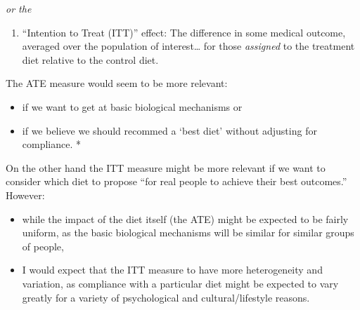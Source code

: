\documentclass[]{tufte-handout}
\providecommand{\tightlist}{%
  \setlength{\itemsep}{0pt}\setlength{\parskip}{0pt}}
\begin{document}

\emph{or the}

\begin{enumerate}
\def\labelenumi{\arabic{enumi}.}
\setcounter{enumi}{1}
\tightlist
\item
  ``Intention to Treat (ITT)'' effect: The difference in some medical
  outcome, averaged over the population of interest\ldots{} for those
  \emph{assigned} to the treatment diet relative to the control diet.
\end{enumerate}

The ATE measure would seem to be more relevant:

\begin{itemize}
\tightlist
\item
  if we want to get at basic biological mechanisms or
\item
  if we believe we should recommed a `best diet' without adjusting for
  compliance. *
\end{itemize}


On the other hand the ITT measure might be more relevant if we want to
consider which diet to propose ``for real people to achieve their best
outcomes.'' However:

\begin{itemize}
\item
  while the impact of the diet itself (the ATE) might be expected to be
  fairly uniform, as the basic biological mechanisms will be similar for
  similar groups of people,
\item
  I would expect that the ITT measure to have more heterogeneity and
  variation, as compliance with a particular diet might be expected to
  vary greatly for a variety of psychological and cultural/lifestyle
  reasons.
\end{itemize}
\end{document}

